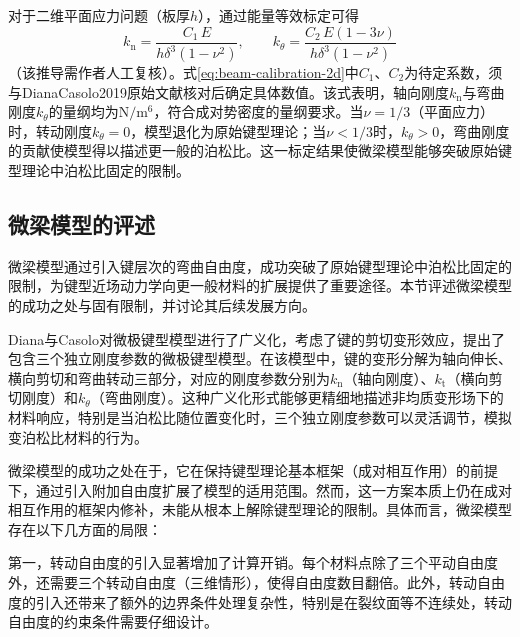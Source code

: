 对于二维平面应力问题（板厚$h$），通过能量等效标定可得
\begin{equation}
  k_{\mathrm{n}}=\frac{C_{1}\,E}{h\delta^{3}(1-\nu^{2})},
  \qquad
  k_{\theta}=\frac{C_{2}\,E(1-3\nu)}{h\delta^{3}(1-\nu^{2})}
  \label{eq:beam-calibration-2d}
\end{equation}
（该推导需作者人工复核）。式\eqref{eq:beam-calibration-2d}中$C_{1}$、$C_{2}$为待定系数，须与DianaCasolo2019原始文献核对后确定具体数值。该式表明，轴向刚度$k_{\mathrm{n}}$与弯曲刚度$k_{\theta}$的量纲均为$\mathrm{N}/\mathrm{m}^{6}$，符合成对势密度的量纲要求。当$\nu=1/3$（平面应力）时，转动刚度$k_{\theta}=0$，模型退化为原始键型理论；当$\nu<1/3$时，$k_{\theta}>0$，弯曲刚度的贡献使模型得以描述更一般的泊松比。这一标定结果使微梁模型能够突破原始键型理论中泊松比固定的限制。


\subsection{微梁模型的评述}\label{sec:beam-review}

微梁模型通过引入键层次的弯曲自由度，成功突破了原始键型理论中泊松比固定的限制，为键型近场动力学向更一般材料的扩展提供了重要途径。本节评述微梁模型的成功之处与固有限制，并讨论其后续发展方向。

Diana与Casolo\cite{DianaCasolo2019}对微极键型模型进行了广义化，考虑了键的剪切变形效应，提出了包含三个独立刚度参数的微极键型模型。在该模型中，键的变形分解为轴向伸长、横向剪切和弯曲转动三部分，对应的刚度参数分别为$k_{\mathrm{n}}$（轴向刚度）、$k_{\mathrm{t}}$（横向剪切刚度）和$k_{\theta}$（弯曲刚度）。这种广义化形式能够更精细地描述非均质变形场下的材料响应，特别是当泊松比随位置变化时，三个独立刚度参数可以灵活调节，模拟变泊松比材料的行为。

微梁模型的成功之处在于，它在保持键型理论基本框架（成对相互作用）的前提下，通过引入附加自由度扩展了模型的适用范围。然而，这一方案本质上仍在成对相互作用的框架内修补，未能从根本上解除键型理论的限制。具体而言，微梁模型存在以下几方面的局限：

第一，转动自由度的引入显著增加了计算开销。每个材料点除了三个平动自由度外，还需要三个转动自由度（三维情形），使得自由度数目翻倍。此外，转动自由度的引入还带来了额外的边界条件处理复杂性，特别是在裂纹面等不连续处，转动自由度的约束条件需要仔细设计。

